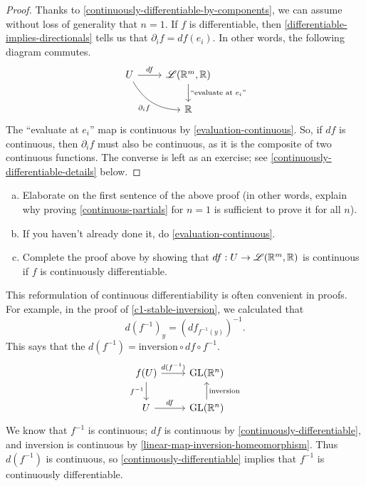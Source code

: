\begin{proof}
	Thanks to \cref{continuously-differentiable-by-components}, we can assume without loss of generality that $n = 1$. If $f$ is differentiable, then \cref{differentiable-implies-directionals} tells us that $\partial_i f = df(e_i)$. In other words, the following diagram commutes.
	\[ \begin{tikzcd} U \ar{r}{df} \ar[bend right]{dr}[swap]{\partial_i f} & \mathscr{L}(\R^m, \R) \ar{d}{\text{``evaluate at $e_i$''}} \\ & \R \end{tikzcd} \]
	The ``evaluate at $e_i$'' map is continuous by \cref{evaluation-continuous}. So, if $df$ is continuous, then $\partial_i f$ must also be continuous, as it is the composite of two continuous functions. The converse is left as an exercise; see \cref{continuously-differentiable-details} below. 
\end{proof}

\begin{exercise} \label{continuously-differentiable-details}
	\begin{enumerate}[(a)]
		\item Elaborate on the first sentence of the above proof (in other words, explain why proving \cref{continuous-partials} for $n = 1$ is sufficient to prove it for all $n$). 
		\item If you haven't already done it, do \cref{evaluation-continuous}. 
		\item Complete the proof above by showing that $df : U \to \mathscr{L}(\mathbb{R}^m, \mathbb{R})$ is continuous if $f$ is continuously differentiable. 
	\end{enumerate}
\end{exercise}

\begin{remark}
	This reformulation of continuous differentiability is often convenient in proofs. For example, in the proof of \cref{c1-stable-inversion}, we calculated that
	\[ d(f^{-1})_y = (df_{f^{-1}(y)})^{-1}. \]
	This says that the $d(f^{-1}) = \text{inversion} \circ df \circ f^{-1}$. 
	\[ \begin{tikzcd} f(U) \ar{d}[swap]{f^{-1}} \ar{r}{d(f^{-1})} & \GL(\R^n) \\ U \ar{r}{df} & \GL(\R^n) \ar{u}[swap]{\text{inversion}}  \end{tikzcd} \]
	We know that $f^{-1}$ is continuous; $df$ is continuous by \cref{continuously-differentiable}, and inversion is continuous by \cref{linear-map-inversion-homeomorphism}. Thus $d(f^{-1})$ is continuous, so \cref{continuously-differentiable} implies that $f^{-1}$ is continuously differentiable. 
\end{remark}

